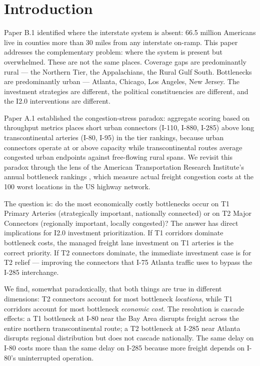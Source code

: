 \section{Introduction}

Paper B.1 identified where the interstate system is absent: 66.5 million Americans live in counties more than 30 miles from any interstate on-ramp. This paper addresses the complementary problem: where the system is present but overwhelmed. These are not the same places. Coverage gaps are predominantly rural --- the Northern Tier, the Appalachians, the Rural Gulf South. Bottlenecks are predominantly urban --- Atlanta, Chicago, Los Angeles, New Jersey. The investment strategies are different, the political constituencies are different, and the I2.0 interventions are different.

Paper A.1 established the congestion-stress paradox: aggregate scoring based on throughput metrics places short urban connectors (I-110, I-880, I-285) above long transcontinental arteries (I-80, I-95) in the tier rankings, because urban connectors operate at or above capacity while transcontinental routes average congested urban endpoints against free-flowing rural spans. We revisit this paradox through the lens of the American Transportation Research Institute's annual bottleneck rankings \citep{ATRI2024}, which measure actual freight congestion costs at the 100 worst locations in the US highway network.

The question is: do the most economically costly bottlenecks occur on T1 Primary Arteries (strategically important, nationally connected) or on T2 Major Connectors (regionally important, locally congested)? The answer has direct implications for I2.0 investment prioritization. If T1 corridors dominate bottleneck costs, the managed freight lane investment on T1 arteries is the correct priority. If T2 connectors dominate, the immediate investment case is for T2 relief --- improving the connectors that I-75 Atlanta traffic uses to bypass the I-285 interchange.

We find, somewhat paradoxically, that both things are true in different dimensions: T2 connectors account for most bottleneck \textit{locations}, while T1 corridors account for most bottleneck \textit{economic cost}. The resolution is cascade effects: a T1 bottleneck at I-80 near the Bay Area disrupts freight across the entire northern transcontinental route; a T2 bottleneck at I-285 near Atlanta disrupts regional distribution but does not cascade nationally. The same delay on I-80 costs more than the same delay on I-285 because more freight depends on I-80's uninterrupted operation.

